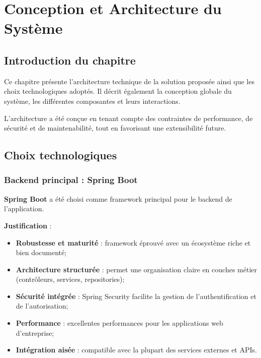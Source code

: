\chapter{Conception et Architecture du Système}
\label{chap:conception-architecture}

\section*{Introduction du chapitre}

Ce chapitre présente l'architecture technique de la solution proposée ainsi que les choix technologiques adoptés. Il décrit également la conception globale du système, les différentes composantes et leurs interactions.

L'architecture a été conçue en tenant compte des contraintes de performance, de sécurité et de maintenabilité, tout en favorisant une extensibilité future.


\section{Choix technologiques}
\label{sec:choix-technologiques}

\subsection{Backend principal : Spring Boot}
\label{subsec:backend-spring}

\textbf{Spring Boot} a été choisi comme framework principal pour le backend de l'application.

\textbf{Justification} :

\begin{itemize}
    \item \textbf{Robustesse et maturité} : framework éprouvé avec un écosystème riche et bien documenté;
    
    \item \textbf{Architecture structurée} : permet une organisation claire en couches métier (contrôleurs, services, repositories);
    
    \item \textbf{Sécurité intégrée} : Spring Security facilite la gestion de l'authentification et de l'autorisation;
    
    \item \textbf{Performance} : excellentes performances pour les applications web d'entreprise;
    
    \item \textbf{Intégration aisée} : compatible avec la plupart des services externes et APIs.
\end{itemize}

